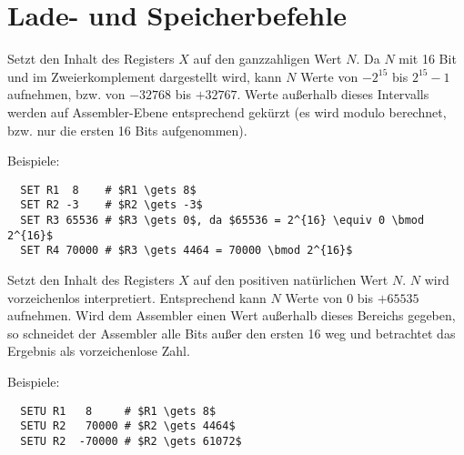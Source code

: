 \section{Lade- und Speicherbefehle}

Setzt den Inhalt des Registers $X$ auf den ganzzahligen Wert $N$.
Da $N$ mit 16 Bit und im Zweierkomplement dargestellt wird, kann $N$ Werte von
$-2^{15}$ bis $2^{15} - 1$ aufnehmen, bzw. von $-32768$ bis $+32767$.
Werte außerhalb dieses Intervalls werden auf Assembler-Ebene entsprechend
gekürzt (es wird modulo berechnet, bzw. nur die ersten 16 Bits aufgenommen).

Beispiele:
\begin{lstlisting}
  SET R1  8    # $R1 \gets 8$
  SET R2 -3    # $R2 \gets -3$
  SET R3 65536 # $R3 \gets 0$, da $65536 = 2^{16} \equiv 0 \bmod 2^{16}$
  SET R4 70000 # $R3 \gets 4464 = 70000 \bmod 2^{16}$
\end{lstlisting}


Setzt den Inhalt des Registers $X$ auf den positiven natürlichen Wert $N$.
$N$ wird vorzeichenlos interpretiert. Entsprechend kann $N$ Werte von $0$ bis
$+65535$ aufnehmen.
Wird dem Assembler einen Wert außerhalb dieses Bereichs gegeben, so
schneidet der Assembler alle Bits außer den ersten 16 weg und betrachtet das
Ergebnis als vorzeichenlose Zahl.

Beispiele:
\begin{lstlisting}
  SETU R1   8     # $R1 \gets 8$
  SETU R2   70000 # $R2 \gets 4464$
  SETU R2  -70000 # $R2 \gets 61072$
\end{lstlisting}

